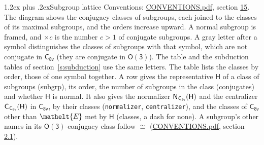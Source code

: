 \documentclass[10pt,a4paper]{article}
\makeatletter
\renewcommand\section{\@startsection{section}{1}{\z@}{-3ex plus -1ex minus -.2ex}%
  {1.2ex plus .2ex}{\normalfont\large\sffamily\bfseries\color{parttitle}}}
\numberwithin{equation}{section}
\newcommand{\eltfont}[1]{{\let\sigma\eltsigma\mathelt{#1}}}
\newcommand{\grp}[1]{\mathsf{#1}}
\newcommand{\cls}[1]{\eltfont{#1}}
\newcommand{\samecls}{\cong}
\newcommand{\hairsp}{\mkern1mu}
\makeatother
\begin{document}
\section{Subgroup lattice}\label{s:subgroups}
Conventions: \href{../../CONVENTIONS.pdf}{CONVENTIONS.pdf}, section \href{../../CONVENTIONS.pdf\#conv.15}{15}.
The diagram shows the conjugacy classes of subgroups, each joined to the classes of its maximal subgroups, and the orders increase upward. A normal subgroup is framed, and ${\times}c$ is the number $c > 1$ of conjugate subgroups. A gray letter after a symbol distinguishes the classes of subgroups with that symbol, which are not conjugate in $\grp{C_{8v}}$ (they are conjugate in \href{O3.pdf}{$\grp{O(3)}$}). The table and the subduction tables of section~\ref{s:subduction} use the same letters. The table lists the classes by order, those of one symbol together. \label{n:group.H}\label{n:head.subgroup}\label{n:head.order}\label{n:head.conjugates}\label{n:head.normal}A row gives the representative $\grp{H}$ of a class of subgroups (subgrp), its order, the number of subgroups in the class (conjugates) and whether $\grp{H}$ is normal. \label{n:group.normalizer}\label{n:group.centralizer}\label{n:head.classes}It also gives the normalizer $\grp{N}_{\hairsp \grp{C_{8v}}}(\grp{H})$ and the centralizer $\grp{C}_{\hairsp \grp{C_{8v}}}(\grp{H})$ in $\grp{C_{8v}}$, by their classes (\texttt{normalizer}, \texttt{centralizer}), and the classes of $\grp{C_{8v}}$ other than $\cls{E}$ met by $\grp{H}$ (classes, a dash for none). A subgroup's other names in its \href{O3.pdf}{$\grp{O(3)}$}-conjugacy class follow $\samecls$ (\href{../../CONVENTIONS.pdf}{CONVENTIONS.pdf}, section \href{../../CONVENTIONS.pdf\#conv.2.1}{2.1}).
\end{document}
